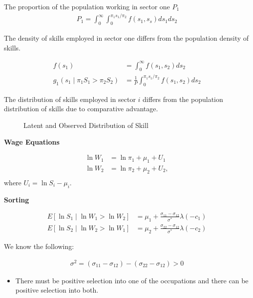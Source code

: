  \begin{frame}
 The proportion of the population working in sector one $P_1$
 \begin{align*}
 P_1 = \int^\infty_0 \int^{\pi_1 s_1 / \pi_2}_0 f(s_1, s_s) ds_1ds_2
 \end{align*}

 The density of skills employed in sector one differs from the population density of skills.

 \begin{align*}
 f(s_1) & = \int^\infty_0 f(s_1, s_2) ds_2 \\
 g_1(s_1 \mid \pi_1 S_1 > \pi_2 S_2) & = \frac{1}{P} \int^{\pi_1 s_1 /\pi_2}_0 f(s_1, s_2) ds_2
 \end{align*}


 The distribution of skills employed in sector $i$ differs from the population distribution of skills due to comparative advantage.
 \end{frame}



\begin{frame}
\begin{figure}[htp]\centering
\caption{Latent and Observed Distribution of Skill}\label{Latent and Observed Distribution of Skill}
\end{figure}
\end{frame}


\begin{frame}

\textbf{Wage Equations}

\begin{align*}
\ln W_1 & = \ln \pi_1 + \mu_1 + U_1 \\
\ln W_2 & = \ln \pi_2 + \mu_2 + U_2, \\
\end{align*}
where $U_i = \ln S_i - \mu_i$.

\end{frame}


\begin{frame}

\textbf{Sorting}

\begin{align*}
E[\ln S_1 \mid \ln W_1 > \ln W_2] & = \mu_1 + \frac{\sigma_{11} - \sigma_{12}}{\sigma^*} \lambda(-c_1) \\
E[\ln S_2 \mid \ln W_2 > \ln W_1] & = \mu_2 + \frac{\sigma_{22} - \sigma_{12}}{\sigma^*} \lambda(-c_2)
\end{align*}

We know the following:

\begin{align*}
\sigma^2 = (\sigma_{11} - \sigma_{12}) -  (\sigma_{22} - \sigma_{12}) > 0
\end{align*}

\begin{itemize}
\item There must be positive selection into one of the occupations and there can be positive selection into both.
\end{itemize}

\end{frame}


